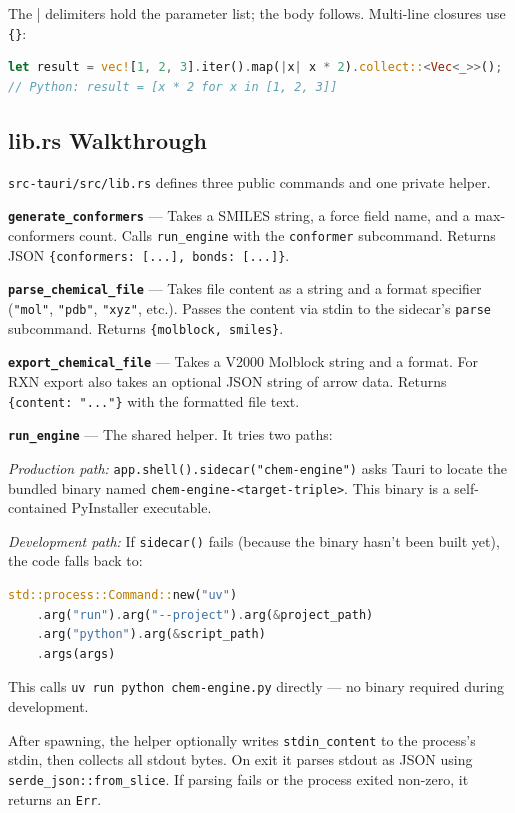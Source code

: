 \documentclass[11pt,a4paper]{article}
\begin{document}
The \lstinline||| delimiters hold the parameter list; the body follows. Multi-line
closures use \lstinline|{}|:
\begin{lstlisting}[language=Rust]
let result = vec![1, 2, 3].iter().map(|x| x * 2).collect::<Vec<_>>();
// Python: result = [x * 2 for x in [1, 2, 3]]
\end{lstlisting}

\subsection{lib.rs Walkthrough}

\texttt{src-tauri/src/lib.rs} defines three public commands and one private helper.

\textbf{\lstinline|generate_conformers|} --- Takes a SMILES string, a force field
name, and a max-conformers count. Calls \lstinline|run_engine| with the
\lstinline|conformer| subcommand. Returns JSON
\lstinline|{conformers: [...], bonds: [...]}|.

\textbf{\lstinline|parse_chemical_file|} --- Takes file content as a string and a
format specifier (\lstinline|"mol"|, \lstinline|"pdb"|, \lstinline|"xyz"|, etc.).
Passes the content via stdin to the sidecar's \lstinline|parse| subcommand.
Returns \lstinline|{molblock, smiles}|.

\textbf{\lstinline|export_chemical_file|} --- Takes a V2000 Molblock string and a
format. For RXN export also takes an optional JSON string of arrow data.
Returns \lstinline|{content: "..."}| with the formatted file text.

\textbf{\lstinline|run_engine|} --- The shared helper. It tries two paths:

\textit{Production path:} \lstinline|app.shell().sidecar("chem-engine")| asks Tauri to
locate the bundled binary named \lstinline|chem-engine-<target-triple>|. This binary
is a self-contained PyInstaller executable.

\textit{Development path:} If \lstinline|sidecar()| fails (because the binary hasn't
been built yet), the code falls back to:
\begin{lstlisting}[language=Rust]
std::process::Command::new("uv")
    .arg("run").arg("--project").arg(&project_path)
    .arg("python").arg(&script_path)
    .args(args)
\end{lstlisting}
This calls \lstinline|uv run python chem-engine.py| directly --- no binary required
during development.

After spawning, the helper optionally writes \lstinline|stdin_content| to the
process's stdin, then collects all stdout bytes. On exit it parses stdout as JSON
using \lstinline|serde_json::from_slice|. If parsing fails or the process exited
non-zero, it returns an \lstinline|Err|.
\end{document}
